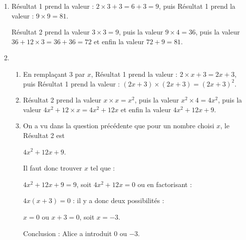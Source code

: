 
\medskip

\begin{enumerate}
\item Résultat 1 prend la valeur : $2 \times 3 + 3 = 6 + 3 = 9$, puis Résultat 1 prend la valeur : $9 \times 9 = 81$.

Résultat 2 prend la valeur $3 \times 3 = 9$, puis la valeur $9 \times 4 = 36$, puis la valeur $36 + 12 \times 3 = 36 + 36 = 72$ et enfin la valeur $72 + 9 = 81$.
\item
	\begin{enumerate}
		\item En remplaçant 3 par $x$, Résultat 1 prend la valeur : $2 \times x + 3 = 2x + 3$, puis Résultat 1 prend la valeur : $(2x + 3)\times (2x + 3) = (2x + 3)^2$.
		\item Résultat 2 prend la valeur $x \times x = x^2$, puis la valeur $x^2 \times 4 = 4x^2$, puis la valeur $4x^2 + 12 \times x = 4x^2 + 12x$ et enfin la valeur $4x^2 + 12x + 9$.
		\item On a vu dans la question précédente que pour un nombre choisi $x$, le Résultat 2 est 
		
$4x^2 + 12x + 9$.
		
Il faut donc trouver $x$ tel que :
		
$4x^2 + 12x + 9 = 9$, soit $4x^2 + 12x = 0$ ou en factorisant :
		
$4x(x + 3) = 0$ : il y a donc deux possibilités :
		
$x = 0$ ou $x + 3 = 0$, soit  $x = - 3$.
		
Conclusion : Alice a introduit $0$ ou $- 3$.
	\end{enumerate}
\end{enumerate}
